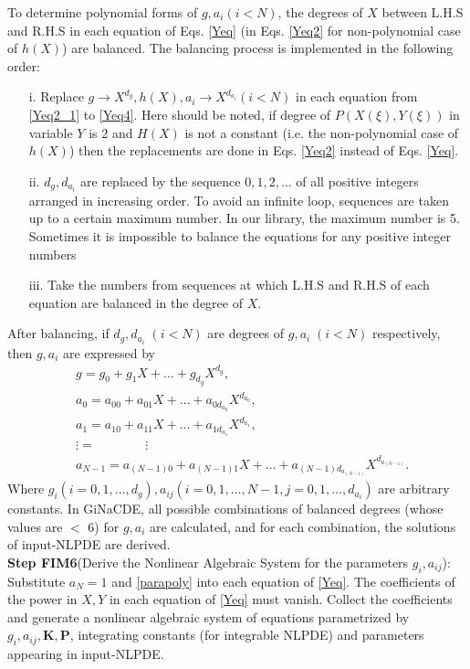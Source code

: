 \documentclass[prd,aps,floats,showkeys,nofootinbib,notitlepage]{revtex4-2}
\begin{document}
	To determine polynomial forms of $g,a_i(i<N)$, the degrees of $X$ between L.H.S and R.H.S in each equation of Eqs. \eqref{Yeq} (in Eqs. \eqref{Yeq2} for non-polynomial case of $h(X)$) are balanced. The balancing process is implemented in the following order:
	\begin{itemize}
		\item[i.] Replace $g\rightarrow X^{d_g},h(X),a_i\rightarrow X^{d_{a{_i}}}(i<N)$ in each equation from \eqref{Yeq2_1} to \eqref{Yeq4}. Here should be noted, if degree of $P(X(\xi),Y(\xi))$ in variable $Y$ is 2 and $H(X)$ is not a constant (i.e. the non-polynomial case of $h(X)$) then the replacements are done in Eqs. \eqref{Yeq2} instead of Eqs. \eqref{Yeq}.  
		\item[ii.]$d_g,d_{a_{i}}$ are replaced by the sequence $0,1, 2,\ldots$ of all positive integers arranged in increasing order. To avoid an infinite loop, sequences are taken up to a certain maximum number. In our library, the maximum number is 5. Sometimes it is impossible to balance the equations for any positive integer numbers 
		\item[iii.] Take the numbers from sequences at which L.H.S and R.H.S of each equation are balanced in the degree of $X$.
	\end{itemize}
	After balancing, if $d_{g}, d_{a_{i}}\;(i<N)$ are degrees of $g,a_{i}\;(i<N)$ respectively, then $g,a_{i}$ are expressed by
	\begin{subequations}\label{parapoly}
		\begin{align}
			\label{gpoly}&g=g_0+g_1X+\ldots+g_{d_g}X^{d_g},\\
			\label{a0poly}&a_{0}=a_{00}+a_{01}X+\ldots+a_{0d_{a_{0}}}X^{d_{a_{0}}},\\
			\label{a1poly}&a_{1}=a_{10}+a_{11}X+\ldots+a_{1d_{a_{1}}}X^{d_{a_{1}}},\\
			&\vdots=\;\;\;\;\;\;\;\;\;\;\;\;\;\;\vdots\nonumber\\
			\label{aNminus1poly}&a_{N-1}=a_{(N-1)0}+a_{(N-1)1}X+\ldots+a_{(N-1)d_{a_{(N-1)}}}X^{d_{a_{(N-1)}}}.
		\end{align}
	\end{subequations}
	Where $g_i(i=0,1,\ldots,d_g),a_{ij}(i=0,1,\ldots,N-1,j=0,1,\ldots,d_{a_{i}})$ are arbitrary constants.
	In GiNaCDE, all possible combinations of balanced degrees (whose values are $<$ 6) for $g,a_i$ are calculated, and for each combination, the solutions of input-NLPDE are derived.\\
	
	
	\textbf{Step FIM6}(Derive the Nonlinear Algebraic System for the parameters $g_i,a_{ij}$): Substitute $a_N=1$ and \eqref{parapoly} into each equation of \eqref{Yeq}. The coefficients of the power in $X,Y$ in each equation of \eqref{Yeq} must vanish. Collect the coefficients and generate a nonlinear algebraic system of equations parametrized by $g_i,a_{ij},\boldsymbol{K},\boldsymbol{P}$, integrating constants (for integrable NLPDE) and parameters appearing in input-NLPDE.\\
	
\end{document}
